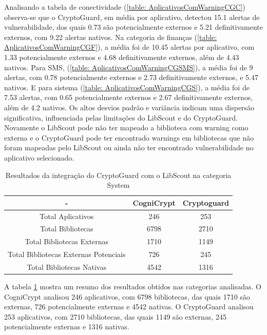 Analisando a tabela de conectividade (\ref{table: AplicativosComWarningCGC})  observa-se que o CryptoGuard, em média por aplicativo, detectou 15.1 alertas de vulnerabilidade, dos quais 0.73 são potencialmente externos e 5.21 definitivamente externos, com 9.22 alertas nativos. 
Na categoria de finanças (\ref{table: AplicativosComWarningCGF}), a média foi de 10.45 alertas por aplicativo, com 1.33 potencialmente externos e 4.68 definitivamente externos, além de 4.43 nativos.
Para SMS, (\ref{table: AplicativosComWarningCGSMS}), a média foi de 9 alertas, com 0.78 potencialmente externos e 2.73 definitivamente externos, e 5.47 nativos.
E para sistema (\ref{table: AplicativosComWarningCGS}), a média foi de 7.53 alertas, com 0.65 potencialmente externos e 2.67 definitivamente externos, além de 4.2 nativos. 
Os altos desvios padrão e variância indicam uma dispersão significativa, influenciada pelas limitações do LibScout e do CryptoGuard. \cite{perception_developers} Novamente o LibScout pode não ter mapeado a biblioteca com warning como externa \cite{LibScout} e o CryptoGuard pode ter encontrado warnings em bibliotecas que não foram mapeadas pelo LibScout ou ainda não ter encontrado vulnerabilidade no aplicativo selecionado. \cite{perception_developers}


\begin{table}[!htbp]
  \centering
  \small
  \begin{tabular}{|c|c|c|}
    \hline
    \textbf{-} & \textbf{CogniCrypt} & \textbf{Cryptoguard} \\
    \hline
    Total Aplicativos & \num{246} & \num{253} \\
    Total Bibliotecas & \num{6798} & \num{2710}  \\
    Total Bibliotecas Externas & \num{1710} & \num{1149} \\
    Total Bibliotecas Externas Potenciais & \num{726} & \num{245} \\
    Total Bibliotecas Nativas & \num{4542} & \num{1316} \\
    \hline
  \end{tabular}
  \caption{Resultados da integração do CryptoGuard com o LibScout na categoria System}
  \label{table: AplicativosComWarningSummary}
\end{table}

A tabela \ref{table: AplicativosComWarningSummary} mostra um resumo dos resultados obtidos nas categorias analisadas. O CogniCrypt analisou 246 aplicativos, com 6798 bibliotecas, das quais 1710 são externas, 726 potencialmente externas e 4542 nativas. O CryptoGuard analisou 253 aplicativos, com 2710 bibliotecas, das quais 1149 são externas, 245 potencialmente externas e 1316 nativas.

